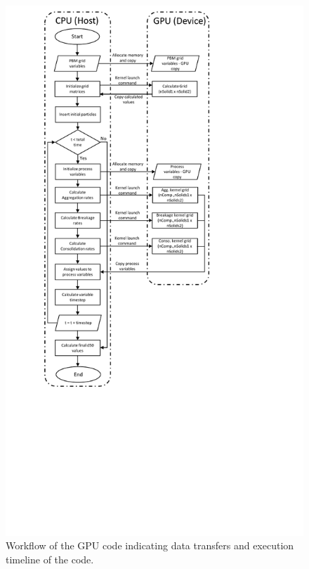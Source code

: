 \documentclass[preprint,10pt,authoryear,review]{elsarticle}
\begin{document}
\begin{figure}
\centering
\includegraphics[scale=0.8,trim=200 250 300 200]{GPU_flowchart.pdf}
\caption{Workflow of the GPU code indicating data transfers and execution timeline of the code.}
\label{fig:mtd_gpu_imp}
\end{figure}
\end{document}
